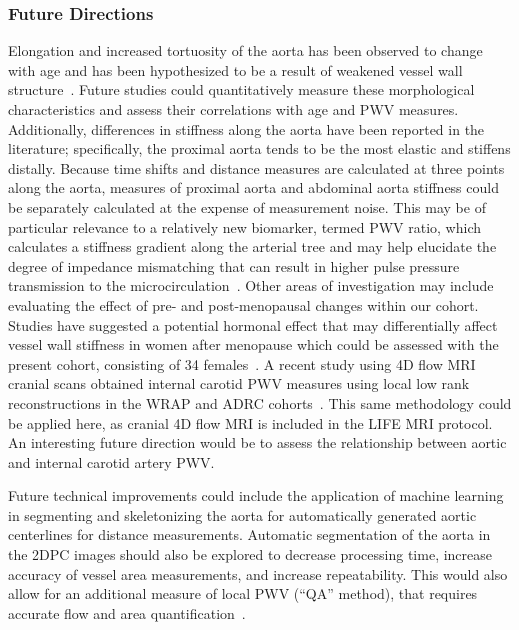 \subsubsection{Future Directions}
Elongation and increased tortuosity of the aorta has been observed to change with age and has been hypothesized to be a result of weakened vessel wall structure~\cite{sugawaraAgeassociatedElongationAscending2008}. Future studies could quantitatively measure these morphological characteristics and assess their correlations with age and PWV measures. Additionally, differences in stiffness along the aorta have been reported in the literature; specifically, the proximal aorta tends to be the most elastic and stiffens distally. Because time shifts and distance measures are calculated at three points along the aorta, measures of proximal aorta and abdominal aorta stiffness could be separately calculated at the expense of measurement noise. This may be of particular relevance to a relatively new biomarker, termed PWV ratio, which calculates a stiffness gradient along the arterial tree and may help elucidate the degree of impedance mismatching that can result in higher pulse pressure transmission to the microcirculation~\cite{covicPulseWaveVelocity2015}. Other areas of investigation may include evaluating the effect of pre- and post-menopausal changes within our cohort. Studies have suggested a potential hormonal effect that may differentially affect vessel wall stiffness in women after menopause which could be assessed with the present cohort, consisting of 34 females~\cite{nethonondaGenderSpecificPatterns2015}. A recent study using 4D flow MRI cranial scans obtained internal carotid PWV measures using local low rank reconstructions in the WRAP and ADRC cohorts~\cite{rivera-riveraAssessmentVascularStiffness2021}. This same methodology could be applied here, as cranial 4D flow MRI is included in the LIFE MRI protocol. An interesting future direction would be to assess the relationship between aortic and internal carotid artery PWV\@. 

Future technical improvements could include the application of machine learning in segmenting and skeletonizing the aorta for automatically generated aortic centerlines for distance measurements. Automatic segmentation of the aorta in the 2DPC images should also be explored to decrease processing time, increase accuracy of vessel area measurements, and increase repeatability. This would also allow for an additional measure of local PWV (“QA” method), that requires accurate flow and area quantification~\cite{vulliemozEstimationLocalAortic2002}. 

